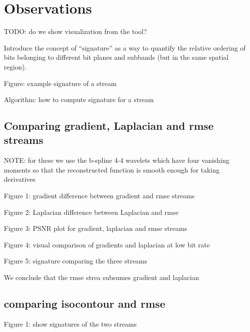 \section{Observations}
TODO: do we show visualization from the tool?

Introduce the concept of ``signature'' as a way to quantify the relative ordering of bits belonging to different bit planes and subbands (but in the same spatial region).

Figure: example signature of a stream

Algorithm: how to compute signature for a stream


\subsection{Comparing gradient, Laplacian and rmse streams}
NOTE: for these we use the b-spline 4-4 wavelets which have four vanishing moments so that the reconstructed function is smooth enough for taking derivatives

Figure 1: gradient difference between gradient and rmse streams

Figure 2: Laplacian difference between Laplacian and rmse

Figure 3: PSNR plot for gradient, laplacian and rmse streams

Figure 4: visual comparison of gradients and laplacian at low bit rate

Figure 5: signature comparing the three streams

We conclude that the rmse strea subsumes gradient and laplacian

\subsection{comparing isocontour and rmse}
Figure 1: show signatures of the two streams


